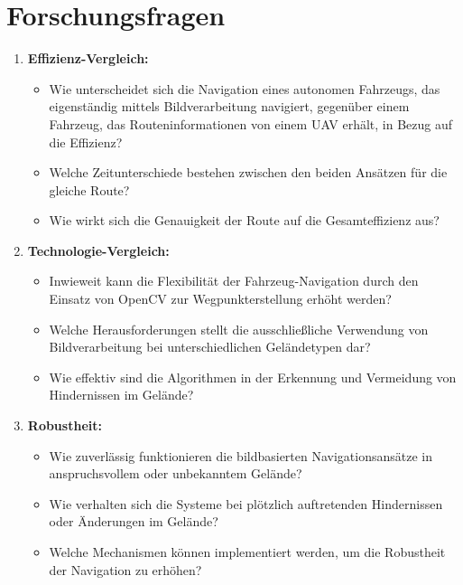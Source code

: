 \section{Forschungsfragen}

\begin{enumerate}
    \item \textbf{Effizienz-Vergleich:}
    \begin{itemize}
        \item Wie unterscheidet sich die Navigation eines autonomen Fahrzeugs, das eigenständig mittels Bildverarbeitung navigiert, gegenüber einem Fahrzeug, das Routeninformationen von einem UAV erhält, in Bezug auf die Effizienz?
        \item Welche Zeitunterschiede bestehen zwischen den beiden Ansätzen für die gleiche Route?
        \item Wie wirkt sich die Genauigkeit der Route auf die Gesamteffizienz aus?
    \end{itemize}
    
    \item \textbf{Technologie-Vergleich:}
    \begin{itemize}
        \item Inwieweit kann die Flexibilität der Fahrzeug-Navigation durch den Einsatz von \gls{OpenCV} zur Wegpunkterstellung erhöht werden?
        \item Welche Herausforderungen stellt die ausschließliche Verwendung von Bildverarbeitung bei unterschiedlichen Geländetypen dar?
        \item Wie effektiv sind die Algorithmen in der Erkennung und Vermeidung von Hindernissen im Gelände?
    \end{itemize}
    
    \item \textbf{Robustheit:}
    \begin{itemize}
        \item Wie zuverlässig funktionieren die bildbasierten Navigationsansätze in anspruchsvollem oder unbekanntem Gelände?
        \item Wie verhalten sich die Systeme bei plötzlich auftretenden Hindernissen oder Änderungen im Gelände?
        \item Welche Mechanismen können implementiert werden, um die Robustheit der Navigation zu erhöhen?
    \end{itemize}
\end{enumerate}
